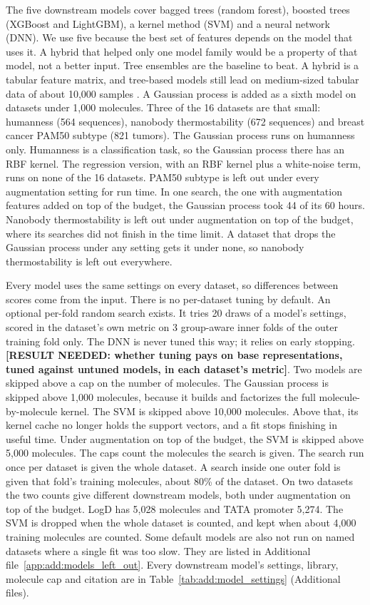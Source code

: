 The five downstream models cover bagged trees (random forest), boosted trees (XGBoost and LightGBM), a kernel method (SVM) and a neural network (DNN). We use five because the best set of features depends on the model that uses it. A hybrid that helped only one model family would be a property of that model, not a better input. Tree ensembles are the baseline to beat. A hybrid is a tabular feature matrix, and tree-based models still lead on medium-sized tabular data of about 10,000 samples \citep{Grinsztajn2022}. A Gaussian process \citep{Rasmussen2006} is added as a sixth model on datasets under 1,000 molecules. Three of the 16 datasets are that small: humanness (564 sequences), nanobody thermostability (672 sequences) and breast cancer PAM50 subtype (821 tumors). The Gaussian process runs on humanness only. Humanness is a classification task, so the Gaussian process there has an RBF kernel. The regression version, with an RBF kernel plus a white-noise term, runs on none of the 16 datasets. PAM50 subtype is left out under every augmentation setting for run time. In one search, the one with augmentation features added on top of the budget, the Gaussian process took 44 of its 60 hours. Nanobody thermostability is left out under augmentation on top of the budget, where its searches did not finish in the time limit. A dataset that drops the Gaussian process under any setting gets it under none, so nanobody thermostability is left out everywhere.

Every model uses the same settings on every dataset, so differences between scores come from the input. There is no per-dataset tuning by default. An optional per-fold random search exists. It tries 20 draws of a model's settings, scored in the dataset's own metric on 3 group-aware inner folds of the outer training fold only. The DNN is never tuned this way; it relies on early stopping. \textbf{[RESULT NEEDED: whether tuning pays on base representations, tuned against untuned models, in each dataset's metric]}. Two models are skipped above a cap on the number of molecules. The Gaussian process is skipped above 1,000 molecules, because it builds and factorizes the full molecule-by-molecule kernel. The SVM is skipped above 10,000 molecules. Above that, its kernel cache no longer holds the support vectors, and a fit stops finishing in useful time. Under augmentation on top of the budget, the SVM is skipped above 5,000 molecules. The caps count the molecules the search is given. The search run once per dataset is given the whole dataset. A search inside one outer fold is given that fold's training molecules, about 80\% of the dataset. On two datasets the two counts give different downstream models, both under augmentation on top of the budget. LogD has 5,028 molecules and TATA promoter 5,274. The SVM is dropped when the whole dataset is counted, and kept when about 4,000 training molecules are counted. Some default models are also not run on named datasets where a single fit was too slow. They are listed in Additional file~\ref{app:add:models_left_out}. Every downstream model's settings, library, molecule cap and citation are in Table~\ref{tab:add:model_settings} (Additional files).

